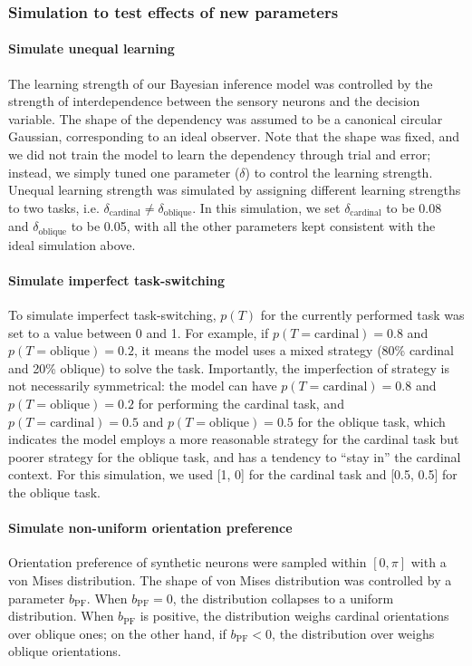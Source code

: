 \documentclass[lineno,pdflatex,sn-basic]{sn-jnl}%
\theoremstyle{thmstyleone}%
\theoremstyle{thmstyletwo}%
\theoremstyle{thmstylethree}%
\begin{document}
\subsubsection{Simulation to test effects of new parameters} \label{sec_ch2:nonideal_simulation_test}
\paragraph{Simulate unequal learning}\label{sec_ch2:simulate_delta} The learning strength of our Bayesian inference model was controlled by the strength of interdependence between the sensory neurons and the decision variable. The shape of the dependency was assumed to be a canonical circular Gaussian, corresponding to an ideal observer. Note that the shape was fixed, and we did not train the model to learn the dependency through trial and error; instead, we simply tuned one parameter ($\delta$) to control the learning strength. Unequal learning strength was simulated by assigning different learning strengths to two tasks, i.e. $\delta_\textrm{cardinal} \neq \delta_\textrm{oblique}$. In this simulation, we set $\delta_\textrm{cardinal}$ to be 0.08 and $\delta_\textrm{oblique}$ to be 0.05, with all the other parameters kept consistent with the ideal simulation above.


\paragraph{Simulate imperfect task-switching} \label{sec_ch2:simulate_prior} To simulate imperfect task-switching, $p(T)$ for the currently performed task was set to a value between 0 and 1. For example, if $p(T = \textrm{cardinal}) = 0.8$ and $p(T = \textrm{oblique}) = 0.2$, it means the model uses a mixed strategy  (80\% cardinal and 20\% oblique) to solve the task. Importantly, the imperfection of strategy is not necessarily symmetrical: the model can have $p(T = \textrm{cardinal}) = 0.8$ and $p(T = \textrm{oblique}) = 0.2$ for performing the cardinal task, and $p(T = \textrm{cardinal}) = 0.5$ and $p(T = \textrm{oblique}) = 0.5$ for the oblique task, which indicates the model employs a more reasonable strategy for the cardinal task but poorer strategy for the oblique task, and has a tendency to ``stay in'' the cardinal context. For this simulation, we used [1, 0] for the cardinal task and [0.5, 0.5] for the oblique task.

\paragraph{Simulate non-uniform orientation preference} \label{sec_ch2:simulate_bPF} Orientation preference of synthetic neurons were sampled within $[0,\pi]$ with a von Mises distribution. The shape of von Mises distribution was controlled by a parameter $b_\textrm{PF}$. When $b_\textrm{PF} = 0$, the distribution collapses to a uniform distribution. When $b_\textrm{PF}$ is positive, the distribution weighs cardinal orientations over oblique ones; on the other hand, if $b_\textrm{PF} < 0$, the distribution over weighs oblique orientations.
\end{document}
